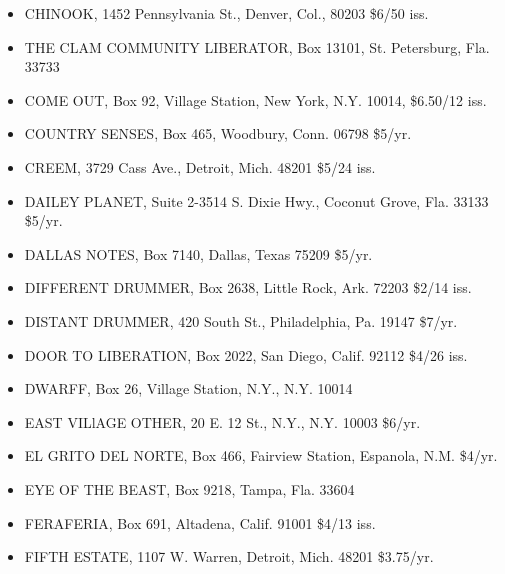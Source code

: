 \documentclass[11pt,twoside,a4paper]{book}
\begin{document}
\begin{minipage}[t]{0.20\textwidth}
\begin{scriptsize}
\begin{itemize}
	\item[] CHINOOK, 1452 Pennsylvania St., Denver, Col., 80203 \$6/50 iss. 
	\item[] THE CLAM COMMUNITY LIBERATOR, Box 13101, St. Petersburg, Fla. 33733 
	\item[] COME OUT, Box 92, Village Station, New York, N.Y. 10014,	\$6.50/12 iss. 
	\item[] COUNTRY SENSES, Box 465, Woodbury, Conn. 06798 \$5/yr. 
	\item[] CREEM, 3729 Cass Ave., Detroit, Mich. 48201 \$5/24 iss. 
	\item[] DAILEY PLANET, Suite 2-3514 S. Dixie Hwy., Coconut Grove, Fla.	33133 \$5/yr. 
	\item[] DALLAS NOTES, Box 7140, Dallas, Texas 75209 \$5/yr. 
	\item[] DIFFERENT DRUMMER, Box 2638, Little Rock, Ark. 72203 \$2/14 iss. 
	\item[] DISTANT DRUMMER, 420 South St., Philadelphia, Pa. 19147 \$7/yr. 
	\item[] DOOR TO LIBERATION, Box 2022, San Diego, Calif. 92112 \$4/26 iss. 
	\item[] DWARFF, Box 26, Village Station, N.Y., N.Y. 10014 
	\item[] EAST VILlAGE OTHER, 20 E. 12 St., N.Y., N.Y. 10003 \$6/yr. 
	\item[] EL GRITO DEL NORTE, Box 466, Fairview Station, Espanola, N.M.	\$4/yr. 
	\item[] EYE OF THE BEAST, Box 9218, Tampa, Fla. 33604  
	\item[] FERAFERIA, Box 691, Altadena, Calif. 	91001 \$4/13 iss. 
	\item[] FIFTH ESTATE, 1107 W. Warren, Detroit, Mich. 48201 \$3.75/yr. 
\end{itemize}
\end{scriptsize}
\end{minipage}\hfill
\end{document}
